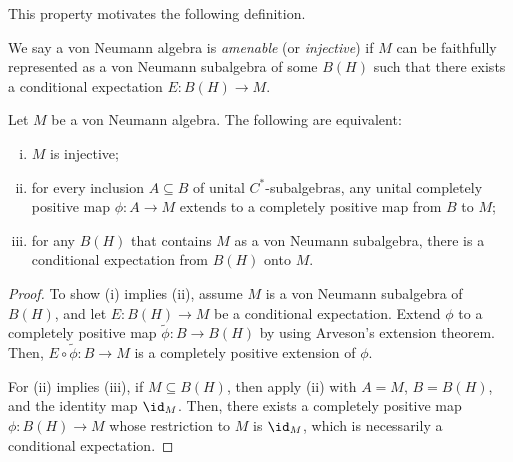 \documentclass[10pt]{mypackage}
\begin{document}
This property motivates the following definition.
\begin{definition}
  We say a von Neumann algebra is \textit{amenable} (or \textit{injective}) if $M$ can be faithfully represented as a von Neumann subalgebra of some $B\left( H \right)$ such that there exists a conditional expectation $E\colon B\left( H \right)\rightarrow M$.
\end{definition}
\begin{proposition}
  Let $M$ be a von Neumann algebra. The following are equivalent:
  \begin{enumerate}[(i)]
    \item $M$ is injective;
    \item for every inclusion $A\subseteq B$ of unital $C^{\ast}$-subalgebras, any unital completely positive map $\phi\colon A\rightarrow M$ extends to a completely positive map from $B$ to $M$;
    \item for any $B(H)$ that contains $M$ as a von Neumann subalgebra, there is a conditional expectation from $B(H)$ onto $M$.
  \end{enumerate}
\end{proposition}
\begin{proof}
  To show (i) implies (ii), assume $M$ is a von Neumann subalgebra of $B(H)$, and let $E\colon B(H)\rightarrow M$ be a conditional expectation. Extend $\phi$ to a completely positive map $ \widetilde{\phi}\colon B\rightarrow B(H) $ by using Arveson's extension theorem. Then, $E\circ \widetilde{\phi}\colon B\rightarrow M$ is a completely positive extension of $\phi$.

  For (ii) implies (iii), if $M\subseteq B(H)$, then apply (ii) with $A = M$, $B = B(H)$, and the identity map $\id_M$. Then, there exists a completely positive map $\phi\colon B(H)\rightarrow M$ whose restriction to $M$ is $\id_M$, which is necessarily a conditional expectation.
\end{proof}
\end{document}
